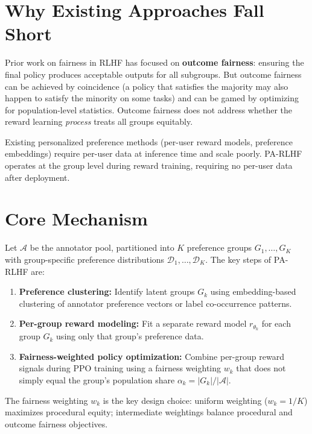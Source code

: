 \documentclass[10pt,twocolumn]{article}
\begin{document}
\section{Why Existing Approaches Fall Short}

Prior work on fairness in RLHF has focused on \textbf{outcome fairness}: ensuring the
final policy produces acceptable outputs for all subgroups. But outcome fairness can
be achieved by coincidence (a policy that satisfies the majority may also happen to
satisfy the minority on some tasks) and can be gamed by optimizing for population-level
statistics. Outcome fairness does not address whether the reward learning \emph{process}
treats all groups equitably.

Existing personalized preference methods (per-user reward models, preference
embeddings) require per-user data at inference time and scale poorly. PA-RLHF
operates at the group level during reward training, requiring no per-user data
after deployment.

\section{Core Mechanism}

Let $\mathcal{A}$ be the annotator pool, partitioned into $K$ preference groups
$G_1, \ldots, G_K$ with group-specific preference distributions
$\mathcal{D}_1, \ldots, \mathcal{D}_K$. The key steps of PA-RLHF are:

\begin{enumerate}[itemsep=2pt,parsep=0pt]
  \item \textbf{Preference clustering:} Identify latent groups $G_k$ using embedding-based
    clustering of annotator preference vectors or label co-occurrence patterns.
  \item \textbf{Per-group reward modeling:} Fit a separate reward model $r_{\theta_k}$
    for each group $G_k$ using only that group's preference data.
  \item \textbf{Fairness-weighted policy optimization:} Combine per-group reward signals
    during PPO training using a fairness weighting $w_k$ that does not simply
    equal the group's population share $\alpha_k = |G_k|/|\mathcal{A}|$.
\end{enumerate}

The fairness weighting $w_k$ is the key design choice: uniform weighting ($w_k = 1/K$)
maximizes procedural equity; intermediate weightings balance procedural and outcome
fairness objectives.
\end{document}
